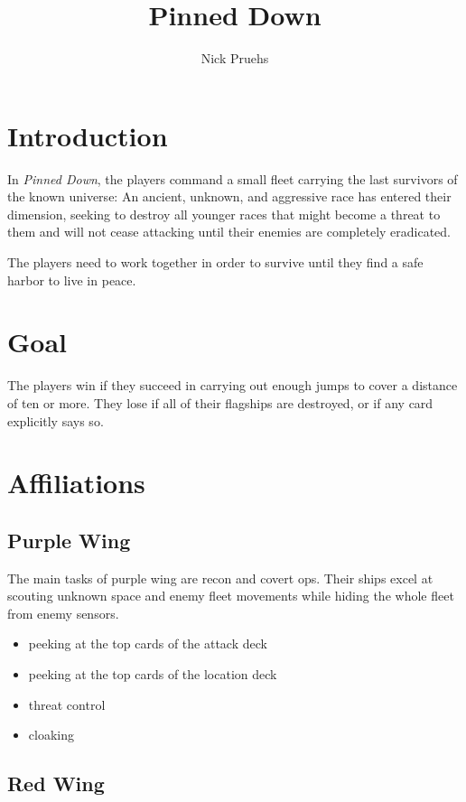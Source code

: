\documentclass[11pt, a4paper]{article}
\title{Pinned Down}
\author{Nick Pruehs}
\begin{document}
\maketitle

\onehalfspacing

\tableofcontents

\section{Introduction}

In \emph{Pinned Down}, the players command a small fleet carrying the last
survivors of the known universe: An ancient, unknown, and aggressive race has
entered their dimension, seeking to destroy all younger races that might become
a threat to them and will not cease attacking until their enemies are completely
eradicated.

The players need to work together in order to survive until they find a safe
harbor to live in peace.

\section{Goal}

The players win if they succeed in carrying out enough jumps to cover a distance
of ten or more. They lose if all of their flagships are destroyed, or if any
card explicitly says so.

\section{Affiliations}
\subsection{Purple Wing}

The main tasks of purple wing are recon and covert ops. Their ships excel at
scouting unknown space and enemy fleet movements while hiding the whole fleet
from enemy sensors.

\begin{itemize}
 \item peeking at the top cards of the attack deck
 \item peeking at the top cards of the location deck
 \item threat control
 \item cloaking
\end{itemize}

\subsection{Red Wing}
\end{document}
